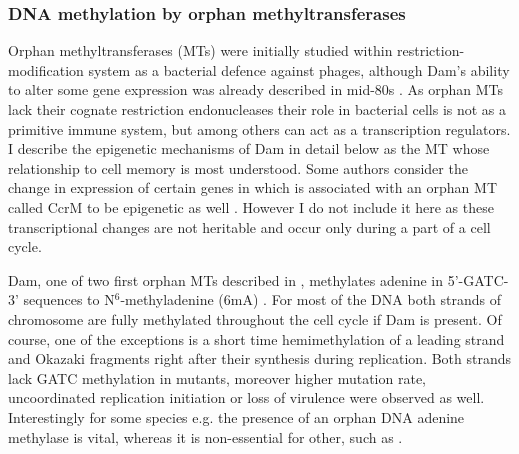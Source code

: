 \subsubsection{DNA methylation by orphan methyltransferases}
Orphan methyltransferases (MTs) were initially studied within restriction-modification system as a bacterial defence against phages, although Dam's ability to alter some gene expression was already described in mid-80s \cite{sternberg1985evidence, bickle1993biology}.
As orphan MTs lack their cognate restriction endonucleases their role in bacterial cells is not as a primitive immune system, but among others can act as a transcription regulators.
I describe the epigenetic mechanisms of Dam in detail below as the MT whose relationship to cell memory is most understood.
Some authors consider the change in expression of certain genes in  which is associated with an orphan MT called CcrM to be epigenetic as well \cite{casadesus2006epigenetic, adhikari2016dna}.
However I do not include it here as these transcriptional changes are not heritable and occur only during a part of a cell cycle.

Dam, one of two first orphan MTs described in , methylates adenine in 5'-GATC-3' sequences to N$^6$-methyladenine (6mA) \cite{marinus1973isolation}.
For most of the DNA both strands of chromosome are fully methylated throughout the cell cycle if Dam is present.
Of course, one of the exceptions is a short time hemimethylation of a leading strand and Okazaki fragments right after their synthesis during replication.
Both strands lack GATC methylation in  mutants, moreover higher mutation rate, uncoordinated replication initiation or loss of virulence were observed as well.
Interestingly for some species e.g.  the presence of an orphan DNA adenine methylase is vital, whereas it is non-essential for other, such as  \cite{casadesus2006epigenetic, casadesus2013programmed, adhikari2016dna}.


